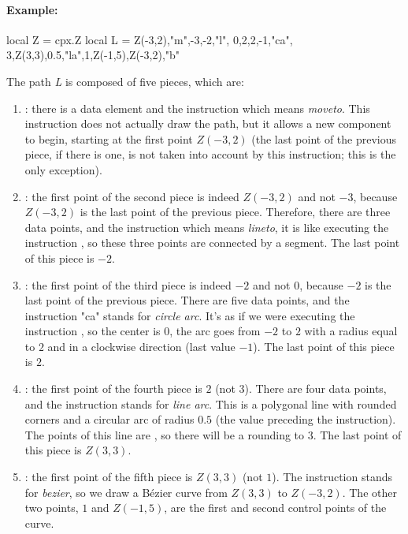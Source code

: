 \paragraph{Example:}
\begin{Luacode}
local Z = cpx.Z
local L = { Z(-3,2),"m",-3,-2,"l", 0,2,2,-1,"ca", 3,Z(3,3),0.5,"la",1,Z(-1,5),Z(-3,2),"b" }
\end{Luacode}
The path \emph{L} is composed of five pieces, which are:
    \begin{enumerate}
        \item {}: there is a data element and the instruction  which means \emph{moveto}. This instruction does not actually draw the path, but it allows a new component to begin, starting at the first point $Z(-3,2)$ (the last point of the previous piece, if there is one, is not taken into account by this instruction; this is the only exception).

        \item {}: the first point of the second piece is indeed $Z(-3,2)$ and not $-3$, because $Z(-3,2)$ is the last point of the previous piece. Therefore, there are three data points, and the instruction  which means \emph{lineto}, it is like executing the instruction , so these three points are connected by a segment. The last point of this piece is $-2$.

        \item {}: the first point of the third piece is indeed $-2$ and not $0$, because $-2$ is the last point of the previous piece. There are five data points, and the instruction "ca" stands for \emph{circle arc}. It's as if we were executing the instruction , so the center is $0$, the arc goes from $-2$ to $2$ with a radius equal to $2$ and in a clockwise direction (last value $-1$). The last point of this piece is $2$.

        \item {}: the first point of the fourth piece is $2$ (not $3$). There are four data points, and the instruction  stands for \emph{line arc}. This is a polygonal line with rounded corners and a circular arc of radius $0.5$ (the value preceding the instruction). The points of this line are , so there will be a rounding to $3$. The last point of this piece is $Z(3,3)$.

        \item {}: the first point of the fifth piece is $Z(3,3)$ (not $1$). The instruction  stands for \emph{bezier}, so we draw a Bézier curve from $Z(3,3)$ to $Z(-3,2)$. The other two points, $1$ and $Z(-1,5)$, are the first and second control points of the curve.
\end{enumerate}

